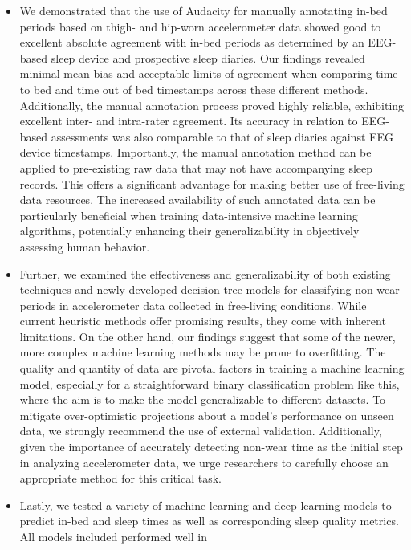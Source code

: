 \documentclass[
  10pt,
]{scrbook}
\begin{document}
\begin{itemize}
\item
  We demonstrated that the use of Audacity for manually annotating
  in-bed periods based on thigh- and hip-worn accelerometer data showed
  good to excellent absolute agreement with in-bed periods as determined
  by an EEG-based sleep device and prospective sleep diaries. Our
  findings revealed minimal mean bias and acceptable limits of agreement
  when comparing time to bed and time out of bed timestamps across these
  different methods. Additionally, the manual annotation process proved
  highly reliable, exhibiting excellent inter- and intra-rater
  agreement. Its accuracy in relation to EEG-based assessments was also
  comparable to that of sleep diaries against EEG device timestamps.
  Importantly, the manual annotation method can be applied to
  pre-existing raw data that may not have accompanying sleep records.
  This offers a significant advantage for making better use of
  free-living data resources. The increased availability of such
  annotated data can be particularly beneficial when training
  data-intensive machine learning algorithms, potentially enhancing
  their generalizability in objectively assessing human behavior.
\item
  Further, we examined the effectiveness and generalizability of both
  existing techniques and newly-developed decision tree models for
  classifying non-wear periods in accelerometer data collected in
  free-living conditions. While current heuristic methods offer
  promising results, they come with inherent limitations. On the other
  hand, our findings suggest that some of the newer, more complex
  machine learning methods may be prone to overfitting. The quality and
  quantity of data are pivotal factors in training a machine learning
  model, especially for a straightforward binary classification problem
  like this, where the aim is to make the model generalizable to
  different datasets. To mitigate over-optimistic projections about a
  model's performance on unseen data, we strongly recommend the use of
  external validation. Additionally, given the importance of accurately
  detecting non-wear time as the initial step in analyzing accelerometer
  data, we urge researchers to carefully choose an appropriate method
  for this critical task.
\item
  Lastly, we tested a variety of machine learning and deep learning
  models to predict in-bed and sleep times as well as corresponding
  sleep quality metrics. All models included performed well in

\end{itemize}
\end{document}
